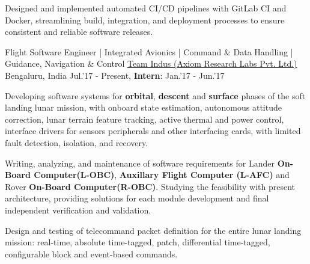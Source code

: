 \begin{cventries}
{\begin{cvitems}
		\item{\large Designed and implemented automated CI/CD pipelines with GitLab CI and Docker, streamlining build, integration, and deployment processes to ensure consistent and reliable software releases.}
		\end{cvitems}
	}
	\nopagebreak
    \cventry
    {\large Flight Software Engineer | Integrated Avionics | Command \& Data Handling | Guidance, Navigation \& Control}
	{\href{http://www.teamindus.in/}{\large Team Indus (Axiom Research Labs Pvt. Ltd.)}}
	{\large Bengaluru, India}
	{\large Jul.'17 - Present, \textbf{Intern}: Jan.'17 - Jun.'17}
	{
		\begin{cvitems}
			\item{\large Developing software systems for \textbf{orbital}, \textbf{descent} and \textbf{surface} phases of the soft landing lunar mission, with onboard state estimation, autonomous attitude correction, lunar terrain feature tracking, active thermal and power control, interface drivers for sensors peripherals and other interfacing cards, with limited fault detection, isolation, and recovery.}
			\item{\large Writing, analyzing, and maintenance of software requirements for Lander \textbf{On-Board Computer(L-OBC)}, \textbf{Auxillary Flight Computer (L-AFC)} and Rover \textbf{On-Board Computer(R-OBC)}. Studying the feasibility with present architecture, providing solutions for each module development and final independent verification and validation.}
			\item{\large Design and testing of telecommand packet definition for the entire lunar landing mission: real-time, absolute time-tagged, patch, differential time-tagged, configurable block and event-based commands.}

\end{cvitems}}
\end{cventries}
